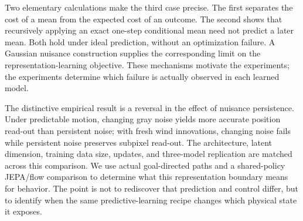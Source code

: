 Two elementary calculations make the third case precise. The first separates the cost of a mean
from the expected cost of an outcome. The second shows that recursively applying an exact one-step
conditional mean need not predict a later mean. Both hold under ideal prediction, without an
optimization failure. A Gaussian nuisance construction supplies the corresponding limit on the
representation-learning objective. These mechanisms motivate the experiments; the experiments
determine which failure is actually observed in each learned model.

The distinctive empirical result is a reversal in the effect of nuisance persistence. Under
predictable motion, changing gray noise yields more accurate position read-out than persistent noise;
with fresh wind innovations, changing noise fails while persistent noise preserves subpixel read-out.
The architecture, latent dimension, training data size, updates, and three-model replication are
matched across this comparison. We use actual goal-directed paths and a shared-policy JEPA/flow
comparison to determine what this representation boundary means for behavior. The point is not to
rediscover that prediction and control differ, but to identify when the same predictive-learning
recipe changes which physical state it exposes.

